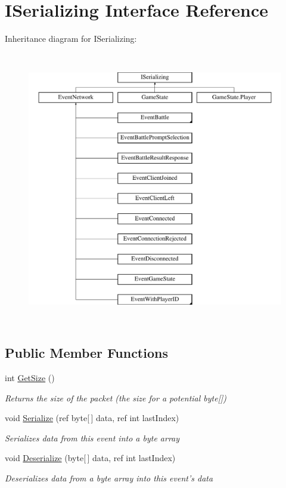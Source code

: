 \hypertarget{interface_i_serializing}{\section{I\-Serializing Interface Reference}
\label{interface_i_serializing}
}
Inheritance diagram for I\-Serializing\-:\begin{figure}[H]
\begin{center}
\leavevmode
\includegraphics[height=12.000000cm]{interface_i_serializing}
\end{center}
\end{figure}
\subsection*{Public Member Functions}
\begin{DoxyCompactItemize}
\item 
int \hyperlink{interface_i_serializing_a9e6ea0afaeac8d1d57e20579f87bebe2}{Get\-Size} ()
\begin{DoxyCompactList}\small\item\em Returns the size of the packet (the size for a potential byte\mbox{[}\mbox{]}) \end{DoxyCompactList}\item 
void \hyperlink{interface_i_serializing_ac31a44c2358a197e774fa3f79cc80356}{Serialize} (ref byte\mbox{[}$\,$\mbox{]} data, ref int last\-Index)
\begin{DoxyCompactList}\small\item\em Serializes data from this event into a byte array \end{DoxyCompactList}\item 
void \hyperlink{interface_i_serializing_a92f8ba3a06d21e7b01e37411e4e3145c}{Deserialize} (byte\mbox{[}$\,$\mbox{]} data, ref int last\-Index)
\begin{DoxyCompactList}\small\item\em Deserializes data from a byte array into this event's data \end{DoxyCompactList}\end{DoxyCompactItemize}


